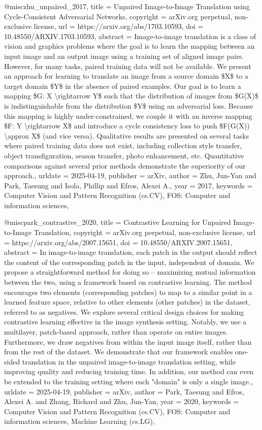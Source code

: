 {@misc{zhu_unpaired_2017,
	title = {Unpaired {Image}-to-{Image} {Translation} using {Cycle}-{Consistent} {Adversarial} {Networks}},
	copyright = {arXiv.org perpetual, non-exclusive license},
	url = {https://arxiv.org/abs/1703.10593},
	doi = {10.48550/ARXIV.1703.10593},
	abstract = {Image-to-image translation is a class of vision and graphics problems where the goal is to learn the mapping between an input image and an output image using a training set of aligned image pairs. However, for many tasks, paired training data will not be available. We present an approach for learning to translate an image from a source domain \$X\$ to a target domain \$Y\$ in the absence of paired examples. Our goal is to learn a mapping \$G: X {\textbackslash}rightarrow Y\$ such that the distribution of images from \$G(X)\$ is indistinguishable from the distribution \$Y\$ using an adversarial loss. Because this mapping is highly under-constrained, we couple it with an inverse mapping \$F: Y {\textbackslash}rightarrow X\$ and introduce a cycle consistency loss to push \$F(G(X)) {\textbackslash}approx X\$ (and vice versa). Qualitative results are presented on several tasks where paired training data does not exist, including collection style transfer, object transfiguration, season transfer, photo enhancement, etc. Quantitative comparisons against several prior methods demonstrate the superiority of our approach.},
	urldate = {2025-04-19},
	publisher = {arXiv},
	author = {Zhu, Jun-Yan and Park, Taesung and Isola, Phillip and Efros, Alexei A.},
	year = {2017},
	keywords = {Computer Vision and Pattern Recognition (cs.CV), FOS: Computer and information sciences},
}

@misc{park_contrastive_2020,
	title = {Contrastive {Learning} for {Unpaired} {Image}-to-{Image} {Translation}},
	copyright = {arXiv.org perpetual, non-exclusive license},
	url = {https://arxiv.org/abs/2007.15651},
	doi = {10.48550/ARXIV.2007.15651},
	abstract = {In image-to-image translation, each patch in the output should reflect the content of the corresponding patch in the input, independent of domain. We propose a straightforward method for doing so -- maximizing mutual information between the two, using a framework based on contrastive learning. The method encourages two elements (corresponding patches) to map to a similar point in a learned feature space, relative to other elements (other patches) in the dataset, referred to as negatives. We explore several critical design choices for making contrastive learning effective in the image synthesis setting. Notably, we use a multilayer, patch-based approach, rather than operate on entire images. Furthermore, we draw negatives from within the input image itself, rather than from the rest of the dataset. We demonstrate that our framework enables one-sided translation in the unpaired image-to-image translation setting, while improving quality and reducing training time. In addition, our method can even be extended to the training setting where each "domain" is only a single image.},
	urldate = {2025-04-19},
	publisher = {arXiv},
	author = {Park, Taesung and Efros, Alexei A. and Zhang, Richard and Zhu, Jun-Yan},
	year = {2020},
	keywords = {Computer Vision and Pattern Recognition (cs.CV), FOS: Computer and information sciences, Machine Learning (cs.LG)},
}

}
